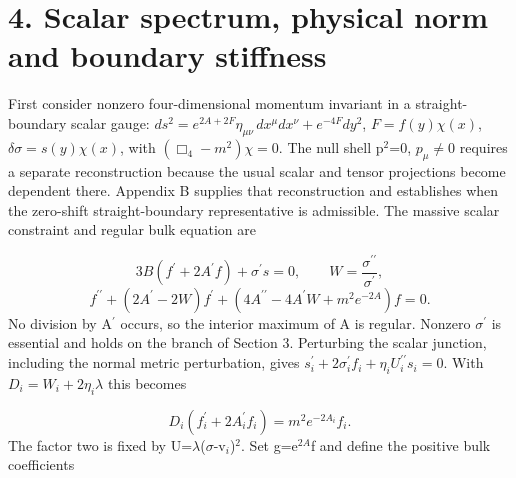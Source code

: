 \documentclass[11pt,a4paper]{article}
\begin{document}
\section*{4. Scalar spectrum, physical norm and boundary stiffness}
First consider nonzero four-dimensional momentum invariant in a straight-boundary scalar gauge: \ensuremath{ds^2=e^{2A+2F}\eta_{\mu\nu}\,dx^\mu dx^\nu+e^{-4F}dy^2}, \ensuremath{F=f(y)\chi(x)}, \ensuremath{\delta\sigma=s(y)\chi(x)}, with \ensuremath{(\Box_4-m^2)\chi=0}. The null shell p\ensuremath{{}^{2}}=0, \ensuremath{p_\mu}\ensuremath{\ne}0 requires a separate reconstruction because the usual scalar and tensor projections become dependent there. Appendix B supplies that reconstruction and establishes when the zero-shift straight-boundary representative is admissible. The massive scalar constraint and regular bulk equation are \cite{ref3,ref4}

\begin{equation}
3B(f^\prime+2A^\prime f)+\sigma^\prime s=0,\qquad W=\frac{\sigma^{\prime\prime}}{\sigma^\prime},\tag{10}
\end{equation}
\begin{equation}
f^{\prime\prime}+(2A^\prime-2W)f^\prime+(4A^{\prime\prime}-4A^\prime W+m^2e^{-2A})f=0.\tag{11}
\end{equation}
No division by A\ensuremath{{}^{\prime}} occurs, so the interior maximum of A is regular. Nonzero \ensuremath{\sigma}\ensuremath{{}^{\prime}} is essential and holds on the branch of Section 3. Perturbing the scalar junction, including the normal metric perturbation, gives \ensuremath{s_i^{\prime}+2\sigma_i^{\prime}f_i+\eta_iU_i^{\prime\prime}s_i=0}. With \ensuremath{D_i=W_i+2\eta_i\lambda} this becomes

\begin{equation}
D_i(f_i^\prime+2A_i^\prime f_i)=m^2e^{-2A_i}f_i.\tag{12}
\end{equation}
The factor two is fixed by U=\ensuremath{\lambda}(\ensuremath{\sigma}-v\ensuremath{{}_{i}})\ensuremath{{}^{2}}. Set g=e\ensuremath{{}^{2A}}f and define the positive bulk coefficients
\end{document}
